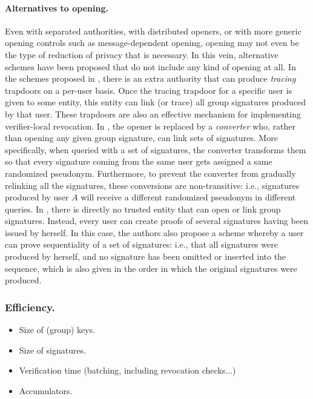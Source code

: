 \paragraph{Alternatives to opening.}
%
Even with separated authorities, with distributed openers, or with more generic
opening controls such as message-dependent opening, opening may not even be
the type of reduction of privacy that is necessary. In this vein, alternative
schemes have been proposed that do not include any kind of
opening at all.
%
In the schemes proposed in \cite{kty04,cpy06,bcly08}, there is an extra
authority that can produce \emph{tracing} trapdoors on a per-user basis.
Once the tracing trapdoor for a specific user is given to some entity, this
entity can link (or trace) all group signatures produced by that user.
These trapdoors are also an effective mechanism for implementing verifier-local
revocation.
%
In \cite{gl19}, the opener is replaced by a \emph{converter} who, rather than
opening any given group signature, can link sets of signatures. More
specifically, when queried with a set of signatures, the converter transforms
them so that every signature coming from the same user gets assigned a same
randomized pseudonym. Furthermore, to prevent the converter from gradually
relinking all the signatures, these conversions are non-transitive: i.e.,
signatures produced by user $A$ will receive a different randomized pseudonym in
different queries.
%
In \cite{dl21}, there is directly no trusted entity that can open or link group
signatures. Instead, every user can create proofs of several signatures having
been issued by herself. In this case, the authors also propose a scheme whereby
a user can prove sequentiality of a set of signatures: i.e., that all signatures
were produced by herself, and no signature has been omitted or inserted into the
sequence, which is also given in the order in which the original signatures were
produced.

\subsubsection{Efficiency.}

\begin{itemize}
\item Size of (group) keys.
\item Size of signatures.
\item Verification time (batching, including revocation checks...)
\item Accumulators.
\end{itemize}

